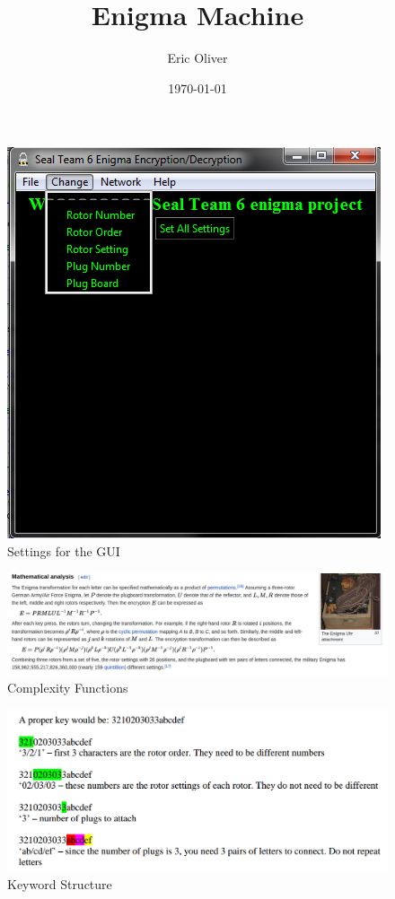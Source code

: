 \documentclass[12pt]{report}
\title{Enigma Machine}
\author{Eric Oliver}
\date{\today}
\begin{document}
\maketitle





\begin{figure}[h]
    \centering
    \includegraphics[scale=.5]{All_Settings.png}
    \caption{Settings for the GUI}
    \label{fig:settings}
\end{figure}

\begin{figure}[h]
    \centering
    \includegraphics[scale=.5]{Complexity.png}
    \caption{Complexity Functions}
    \label{fig:complexity}
\end{figure}

\begin{figure}[h]
    \centering
    \includegraphics[scale=.5]{keyword.png}
    \caption{Keyword Structure}
    \label{fig:keyword}
\end{figure}
\end{document}
